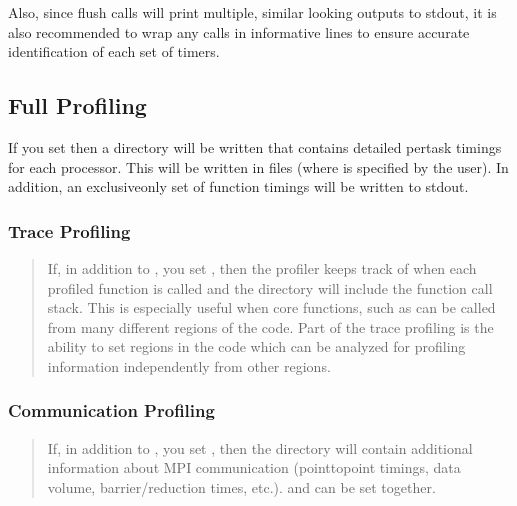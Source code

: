 \documentclass[letterpaper,10pt,english]{sphinxmanual}
\begin{document}
\sphinxAtStartPar
Also, since flush calls will print multiple, similar looking outputs to stdout,
it is also recommended to wrap any  calls in
informative  lines to ensure accurate identification of each
set of timers.


\subsection{Full Profiling}
\label{\detokenize{AMReX_Profiling_Tools:full-profiling}}\label{\detokenize{AMReX_Profiling_Tools:sec-full-profiling}}
\sphinxAtStartPar
If you set  then a  directory will be written that
contains detailed per\sphinxhyphen{}task timings for each processor.  This will be written in
 files (where  is specified by the user).  In addition, an
exclusive\sphinxhyphen{}only set of function timings will be written to stdout.


\subsubsection{Trace Profiling}
\label{\detokenize{AMReX_Profiling_Tools:trace-profiling}}\begin{quote}

\sphinxAtStartPar
If, in addition to , you set ,
then the profiler keeps track of when each profiled function is called and
the  directory will include the function call stack. This is
especially useful when core functions, such as  can be
called from many different regions of the code. Part of the trace profiling
is the ability to set regions in the code which can be analyzed for
profiling information independently from other regions.
\end{quote}


\subsubsection{Communication Profiling}
\label{\detokenize{AMReX_Profiling_Tools:communication-profiling}}\begin{quote}

\sphinxAtStartPar
If, in addition to , you set , then
the  directory will contain additional information about MPI
communication (point\sphinxhyphen{}to\sphinxhyphen{}point timings, data volume, barrier/reduction times,
etc.).  and  can be set
together.
\end{quote}
\end{document}
